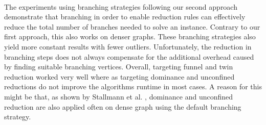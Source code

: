 \documentclass[12pt,a4paper,twoside]{scrartcl}
\numberwithin{equation}{section}
\begin{document}
\paragraph{}
The experiments using branching strategies following our second approach demonstrate that branching in order to enable reduction rules can effectively reduce the total number of branches needed to solve an instance. Contrary to our first approach, this also works on denser graphs. These branching strategies also yield more constant results with fewer outliers. Unfortunately, the reduction in branching steps does not always compensate for the additional overhead caused by finding suitable branching vertices. Overall, targeting funnel and twin reduction worked very well where as targeting dominance and unconfined reductions do not improve the algorithms runtime in most cases. A reason for this might be that, as shown by Stallmann et al. \cite{Stallmann}, dominance and unconfined reduction are also applied often on dense graph using the default branching strategy. 
\end{document}

